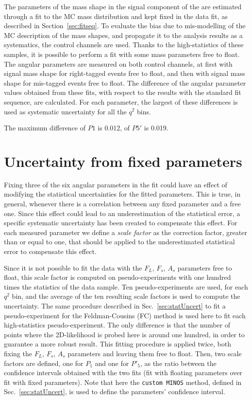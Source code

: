 The parameters of the mass shape in the signal component of the \pdf are estimated through a fit to the MC mass distribution and kept fixed in the data fit, as described in Section~\ref{sec:fitseq}.
To evaluate the bias due to mis-modelling of the MC description of the mass shapes, and propagate it to the analysis results as a systematics, the control channels are used.
Thanks to the high-statistics of these samples, it is possible to perform a fit with some mass parameters free to float.
The angular parameters are measured on both control channels, at first with signal mass shape for right-tagged events free to float, and then with signal mass shape for mis-tagged events free to float.
The difference of the angular parameter values obtained from these fits, with respect to the results with the standard fit sequence, are calculated.
For each parameter, the largest of these differences is used as systematic uncertainty for all the $q^2$ bins.

The maximum difference of $P1$ is 0.012, of $P5'$ is 0.019.

\section{Uncertainty from fixed \pdf parameters}
\label{sec:sys-fixedparm}

Fixing three of the six angular parameters in the fit could have an effect of modifying the statistical uncertainties for the fitted parameters.
This is true, in general, whenever there is a correlation between any fixed parameter and a free one.
Since this effect could lead to an underestimation of the statistical error, a specific systematic uncertainty has been created to compensate this effect.
For each measured parameter we define a \textit{scale factor} as the correction factor, greater than or equal to one, that should be applied to the underestimated statistical error to compensate this effect. 


Since it is not possible to fit the data with the $F_L$, $F_s$, $A_s$ parameters free to float, this scale factor is computed on pseudo-experiments with one hundred times the statistics of the data sample.
Ten pseudo-experiments are used, for each $q^2$ bin, and the average of the ten resulting scale factors is used to compute the uncertainty.
The same procedure described in Sec.~\ref{sec:statUncert} to fit a pseudo-experiment for the Feldman-Cousins (FC) method is used here to fit each high-statistics pseudo-experiment.
The only difference is that the number of points where the 2D-likelihood is probed here is around one hundred, in order to guarantee a more robust result.
This fitting procedure is applied twice, both fixing the $F_L$, $F_s$, $A_s$ parameters and leaving them free to float.
Then, two scale factors are defined, one for $P_1$ and one for $P'_5$, as the ratio between the confidence intervals obtained with the two fits (fit with floating parameters over fit with fixed parameters).
Note that here the {\tt custom MINOS} method, defined in Sec.~\ref{sec:statUncert}, is used to define the parameters' confidence interval.

